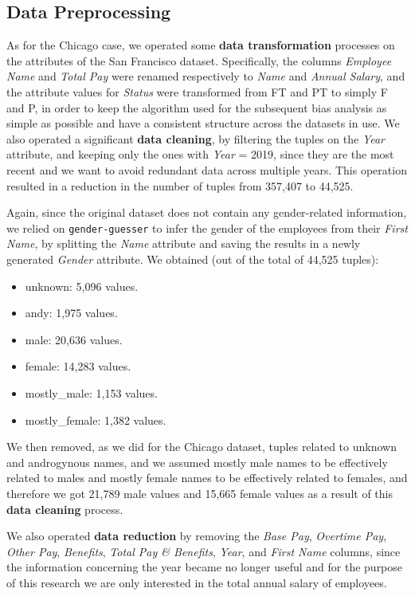 \subsection{Data Preprocessing}
\label{section:san_francisco_data_preprocessing}
As for the Chicago case, we operated some \textbf{data transformation} processes on the attributes of the San Francisco dataset. Specifically, the columns \textit{Employee Name} and \textit{Total Pay} were renamed respectively to \textit{Name} and \textit{Annual Salary}, and the attribute values for \textit{Status} were transformed from FT and PT to simply F and P, in order to keep the algorithm used for the subsequent bias analysis as simple as possible and have a consistent structure across the datasets in use. We also operated a significant \textbf{data cleaning}, by filtering the tuples on the \textit{Year} attribute, and keeping only the ones with \textit{Year} = 2019, since they are the most recent and we want to avoid redundant data across multiple years. This operation resulted in a reduction in the number of tuples from 357,407 to 44,525.

Again, since the original dataset does not contain any gender-related information, we relied on \texttt{gender-guesser} to infer the gender of the employees from their \textit{First Name}, by splitting the \textit{Name} attribute and saving the results in a newly generated \textit{Gender} attribute. We obtained (out of the total of 44,525 tuples):
\begin{itemize}
\item unknown: 5,096 values.
\item andy: 1,975 values.
\item male: 20,636 values.
\item female: 14,283 values.
\item mostly\_male: 1,153 values.
\item mostly\_female: 1,382 values.
\end{itemize}
We then removed, as we did for the Chicago dataset, tuples related to unknown and androgynous names, and we assumed mostly male names to be effectively related to males and mostly female names to be effectively related to females, and therefore we got 21,789 male values and 15,665 female values as a result of this \textbf{data cleaning} process.

We also operated \textbf{data reduction} by removing the \textit{Base Pay}, \textit{Overtime Pay}, \textit{Other Pay}, \textit{Benefits}, \textit{Total Pay \& Benefits}, \textit{Year}, and \textit{First Name} columns, since the information concerning the year became no longer useful and for the purpose of this research we are only interested in the total annual salary of employees.

